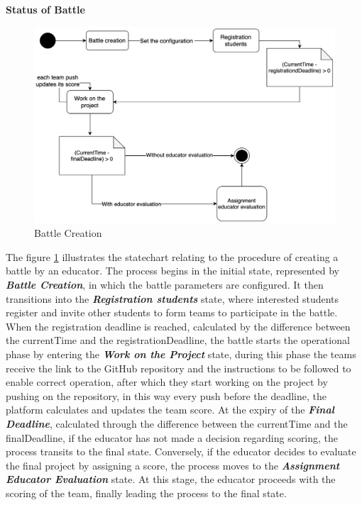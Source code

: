 \vspace{1.5\baselineskip}
\textbf{Status of Battle}

\begin{figure}[h]
    \centering
    \includegraphics[scale=0.4]{images/Statecharts/BattleCreation.png} 
    \caption{Battle Creation}
    \label{fig_BattleCreation}
\end{figure}

The figure \ref{fig_BattleCreation} illustrates the statechart relating to the procedure of creating a battle by an educator.
\newline
The process begins in the initial state, represented by \textbf{\textit{Battle Creation}}, in which the battle parameters are configured.
\newline
It then transitions into the \textbf{\textit{Registration students}} state, where interested students register and invite other students to form teams to participate in the battle. When the registration deadline is reached, calculated by the difference between the currentTime and the registrationDeadline, the battle starts the operational phase by entering the \textbf{\textit{Work on the Project}} state, during this phase the teams receive the link to the GitHub repository and the instructions to be followed to enable correct operation, after which they start working on the project by pushing on the repository, in this way every push before the deadline, the platform calculates and updates the team score.
\newline
At the expiry of the \textbf{\textit{Final Deadline}}, calculated through the difference between the currentTime and the finalDeadline, if the educator has not made a decision regarding scoring, the process transits to the final state.
\newline
Conversely, if the educator decides to evaluate the final project by assigning a score, the process moves to the \textbf{\textit{Assignment Educator Evaluation}} state. At this stage, the educator proceeds with the scoring of the team, finally leading the process to the final state.


